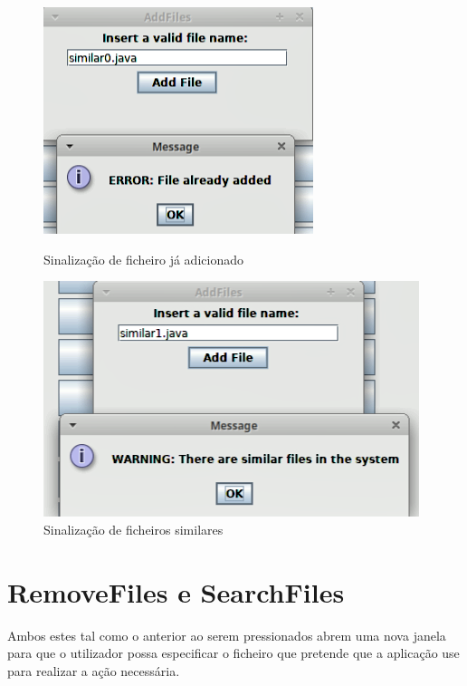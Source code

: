 \documentclass{report}
\begin{document}
\begin{figure}[!tbp]
  \centering
  \begin{minipage}[b]{0.4\textwidth}
    \includegraphics[width=\textwidth]{Addbloom.png}
    \caption{Sinalização de ficheiro já adicionado}
  \end{minipage}
  \hfill
  \begin{minipage}[b]{0.5\textwidth}
    \includegraphics[width=\textwidth]{AddMin.png}
    \caption{Sinalização de ficheiros similares}
  \end{minipage}
\end{figure}

\section{RemoveFiles e SearchFiles}
Ambos estes tal como o anterior ao serem pressionados abrem uma nova janela para que o utilizador possa especificar o ficheiro que pretende que a aplicação use para realizar a ação necessária.
\end{document}
